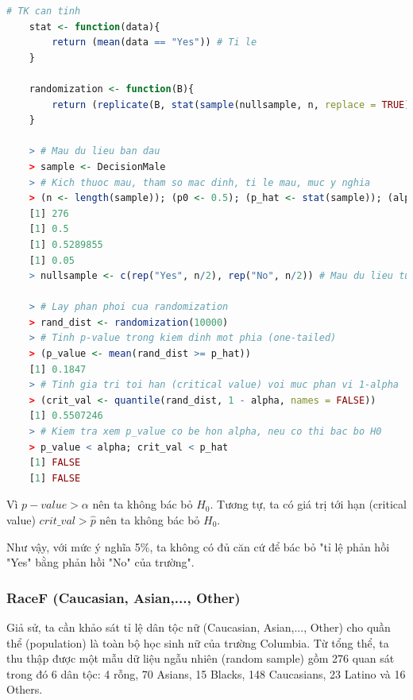 \documentclass[a4paper,12pt]{article}
\begin{document}
	\begin{lstlisting}[language=R]
	# TK can tinh
	stat <- function(data){
		return (mean(data == "Yes")) # Ti le
	}
	
	randomization <- function(B){
		return (replicate(B, stat(sample(nullsample, n, replace = TRUE))))
	}
	
	> # Mau du lieu ban dau
	> sample <- DecisionMale
	> # Kich thuoc mau, tham so mac dinh, ti le mau, muc y nghia
	> (n <- length(sample)); (p0 <- 0.5); (p_hat <- stat(sample)); (alpha <- 0.05)
	[1] 276
	[1] 0.5
	[1] 0.5289855
	[1] 0.05
	> nullsample <- c(rep("Yes", n/2), rep("No", n/2)) # Mau du lieu tuong ung voi H0
	
	> # Lay phan phoi cua randomization
	> rand_dist <- randomization(10000)
	> # Tinh p-value trong kiem dinh mot phia (one-tailed)
	> (p_value <- mean(rand_dist >= p_hat))
	[1] 0.1847
	> # Tinh gia tri toi han (critical value) voi muc phan vi 1-alpha
	> (crit_val <- quantile(rand_dist, 1 - alpha, names = FALSE))
	[1] 0.5507246
	> # Kiem tra xem p_value co be hon alpha, neu co thi bac bo H0
	> p_value < alpha; crit_val < p_hat
	[1] FALSE
	[1] FALSE
	\end{lstlisting}
	
	Vì $p-value > \alpha$ nên ta không bác bỏ $H_0$. Tương tự, ta có giá trị tới hạn (critical value) $crit\_val > \hat{p}$ nên ta không bác bỏ $H_0$. 
	
	Như vậy, với mức ý nghĩa 5\%, ta không có đủ căn cứ để bác bỏ "tỉ lệ phản hồi "Yes" bằng phản hồi "No" của trường". 
	
	\subsubsection{RaceF (Caucasian, Asian,..., Other)}
	Giả sử, ta cần khảo sát tỉ lệ dân tộc nữ (Caucasian, Asian,..., Other) cho quần thể (population) là toàn bộ học sinh nữ của trường Columbia. Từ tổng thể, ta thu thập được một mẫu dữ liệu ngẫu nhiên (random sample) gồm 276 quan sát trong đó 6 dân tộc: 4 rỗng, 70 Asians, 15 Blacks, 148 Caucasians, 23 Latino và 16 Others. 
	
\end{document}
